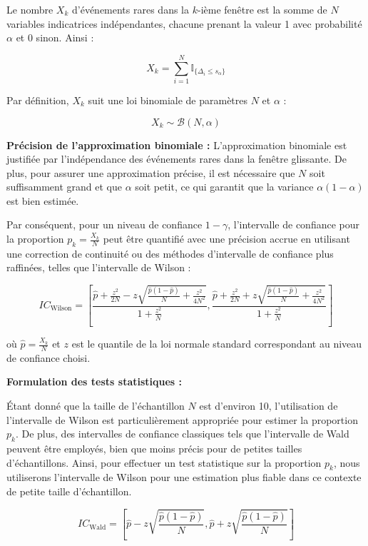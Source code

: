 \documentclass[12pt,a4paper]{article}
\theoremstyle{definition}
\theoremstyle{remark}
\begin{document}
    Le nombre $X_k$ d'événements rares dans la $k$-ième fenêtre est la somme de $N$ variables indicatrices indépendantes, chacune prenant la valeur 1 avec probabilité $\alpha$ et 0 sinon. Ainsi :

    \[
    X_k = \sum_{i=1}^{N} \mathbb{I}_{\{\Delta_i \leq s_\alpha\}}
    \]

    Par définition, $X_k$ suit une loi binomiale de paramètres $N$ et $\alpha$ :

    \[
    X_k \sim \mathcal{B}(N, \alpha)
    \]

    \textbf{Précision de l'approximation binomiale :} 
    L'approximation binomiale est justifiée par l'indépendance des événements rares dans la fenêtre glissante. De plus, pour assurer une approximation précise, il est nécessaire que $N$ soit suffisamment grand et que $\alpha$ soit petit, ce qui garantit que la variance $\alpha(1 - \alpha)$ est bien estimée.

    Par conséquent, pour un niveau de confiance $1 - \gamma$, l'intervalle de confiance pour la proportion $p_k = \frac{X_k}{N}$ peut être quantifié avec une précision accrue en utilisant une correction de continuité ou des méthodes d'intervalle de confiance plus raffinées, telles que l'intervalle de Wilson :

    \[
    IC_{\text{Wilson}} = \left[ \frac{\hat{p} + \frac{z^2}{2N} - z \sqrt{ \frac{\hat{p}(1 - \hat{p})}{N} + \frac{z^2}{4N^2} }}{ 1 + \frac{z^2}{N} }, \frac{\hat{p} + \frac{z^2}{2N} + z \sqrt{ \frac{\hat{p}(1 - \hat{p})}{N} + \frac{z^2}{4N^2} }}{ 1 + \frac{z^2}{N} } \right]
    \]

    où $\hat{p} = \frac{X_k}{N}$ et $z$ est le quantile de la loi normale standard correspondant au niveau de confiance choisi.

    \textbf{Formulation des tests statistiques :}

    Étant donné que la taille de l'échantillon $N$ est d'environ 10, l'utilisation de l'intervalle de Wilson est particulièrement appropriée pour estimer la proportion $p_k$. De plus, des intervalles de confiance classiques tels que l'intervalle de Wald peuvent être employés, bien que moins précis pour de petites tailles d'échantillons. Ainsi, pour effectuer un test statistique sur la proportion $p_k$, nous utiliserons l'intervalle de Wilson pour une estimation plus fiable dans ce contexte de petite taille d'échantillon.

    \[
    IC_{\text{Wald}} = \left[ \hat{p} - z \sqrt{ \frac{\hat{p}(1 - \hat{p})}{N} }, \hat{p} + z \sqrt{ \frac{\hat{p}(1 - \hat{p})}{N} } \right]
    \]
\end{document}
